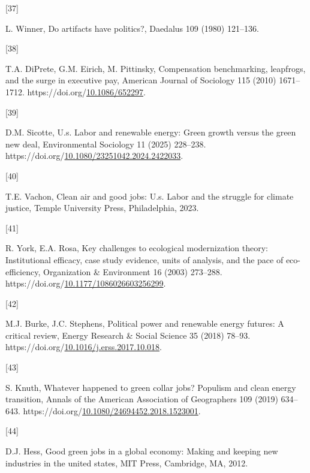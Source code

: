 \documentclass[
  11pt,
]{article}
\newlength{\cslhangindent}
\newlength{\csllabelwidth}
\newenvironment{CSLReferences}[2] %
 {\begin{list}{}{%
  \setlength{\itemindent}{0pt}
  \setlength{\leftmargin}{0pt}
  \setlength{\parsep}{0pt}
  \ifodd #1
   \setlength{\leftmargin}{\cslhangindent}
   \setlength{\itemindent}{-1\cslhangindent}
  \fi
  \setlength{\itemsep}{#2\baselineskip}}}
 {\end{list}}
\newcommand{\CSLLeftMargin}[1]{\parbox[t]{\csllabelwidth}{\strut#1\strut}}
\newcommand{\CSLRightInline}[1]{\parbox[t]{\linewidth - \csllabelwidth}{\strut#1\strut}}
\begin{document}
\begin{CSLReferences}{0}{0}
\CSLLeftMargin{{[}37{]} }%
\CSLRightInline{L. Winner, Do artifacts have politics?, Daedalus 109
(1980) 121--136.}

\CSLLeftMargin{{[}38{]} }%
\CSLRightInline{T.A. DiPrete, G.M. Eirich, M. Pittinsky, Compensation
benchmarking, leapfrogs, and the surge in executive pay, American
Journal of Sociology 115 (2010) 1671--1712.
https://doi.org/\href{https://doi.org/10.1086/652297}{10.1086/652297}.}

\CSLLeftMargin{{[}39{]} }%
\CSLRightInline{D.M. Sicotte, U.s. Labor and renewable energy: Green
growth versus the green new deal, Environmental Sociology 11 (2025)
228--238.
https://doi.org/\href{https://doi.org/10.1080/23251042.2024.2422033}{10.1080/23251042.2024.2422033}.}

\CSLLeftMargin{{[}40{]} }%
\CSLRightInline{T.E. Vachon, Clean air and good jobs: U.s. Labor and the
struggle for climate justice, Temple University Press, Philadelphia,
2023.}

\CSLLeftMargin{{[}41{]} }%
\CSLRightInline{R. York, E.A. Rosa, Key challenges to ecological
modernization theory: Institutional efficacy, case study evidence, units
of analysis, and the pace of eco-efficiency, Organization \& Environment
16 (2003) 273--288.
https://doi.org/\href{https://doi.org/10.1177/1086026603256299}{10.1177/1086026603256299}.}

\CSLLeftMargin{{[}42{]} }%
\CSLRightInline{M.J. Burke, J.C. Stephens, Political power and renewable
energy futures: A critical review, Energy Research \& Social Science 35
(2018) 78--93.
https://doi.org/\href{https://doi.org/10.1016/j.erss.2017.10.018}{10.1016/j.erss.2017.10.018}.}

\CSLLeftMargin{{[}43{]} }%
\CSLRightInline{S. Knuth, Whatever happened to green collar jobs?
Populism and clean energy transition, Annals of the American Association
of Geographers 109 (2019) 634--643.
https://doi.org/\href{https://doi.org/10.1080/24694452.2018.1523001}{10.1080/24694452.2018.1523001}.}

\CSLLeftMargin{{[}44{]} }%
\CSLRightInline{D.J. Hess, Good green jobs in a global economy: Making
and keeping new industries in the united states, MIT Press, Cambridge,
MA, 2012.}


\end{CSLReferences}
\end{document}
